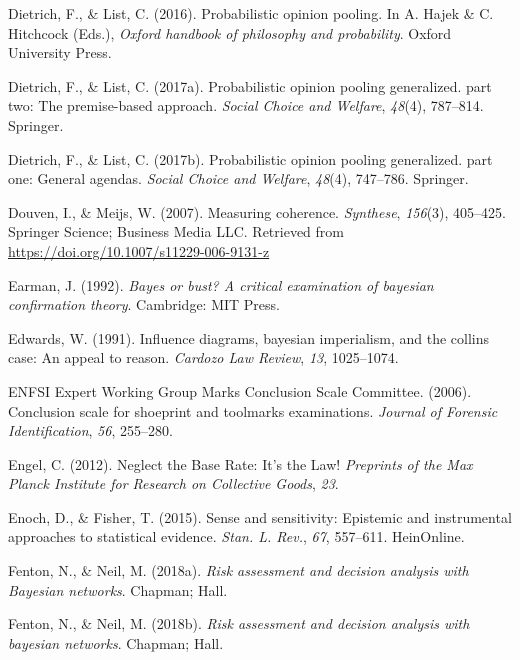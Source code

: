 \documentclass[11pt,dvipsnames,enabledeprecatedfontcommands]{scrartcl}
\begin{document}
\hypertarget{ref-Dietrich2016Probabilistic}{}
Dietrich, F., \& List, C. (2016). Probabilistic opinion pooling. In A.
Hajek \& C. Hitchcock (Eds.), \emph{Oxford handbook of philosophy and
probability}. Oxford University Press.

\hypertarget{ref-dietrich2017probabilistic2}{}
Dietrich, F., \& List, C. (2017a). Probabilistic opinion pooling
generalized. part two: The premise-based approach. \emph{Social Choice
and Welfare}, \emph{48}(4), 787--814. Springer.

\hypertarget{ref-dietrich2017probabilistic1}{}
Dietrich, F., \& List, C. (2017b). Probabilistic opinion pooling
generalized. part one: General agendas. \emph{Social Choice and
Welfare}, \emph{48}(4), 747--786. Springer.

\hypertarget{ref-Douven2007measuring}{}
Douven, I., \& Meijs, W. (2007). Measuring coherence. \emph{Synthese},
\emph{156}(3), 405--425. Springer Science; Business Media LLC. Retrieved
from \url{https://doi.org/10.1007/s11229-006-9131-z}

\hypertarget{ref-earman1992bayes}{}
Earman, J. (1992). \emph{Bayes or bust? A critical examination of
bayesian confirmation theory}. Cambridge: MIT Press.

\hypertarget{ref-Edwards1991Influence-diagr}{}
Edwards, W. (1991). Influence diagrams, bayesian imperialism, and the
collins case: An appeal to reason. \emph{Cardozo Law Review}, \emph{13},
1025--1074.

\hypertarget{ref-ENFSI2006entropy}{}
ENFSI Expert Working Group Marks Conclusion Scale Committee. (2006).
Conclusion scale for shoeprint and toolmarks examinations. \emph{Journal
of Forensic Identification}, \emph{56}, 255--280.

\hypertarget{ref-engel2012NeglectBaseRate}{}
Engel, C. (2012). Neglect the Base Rate: It's the Law! \emph{Preprints
of the Max Planck Institute for Research on Collective Goods},
\emph{23}.

\hypertarget{ref-enoch2015sense}{}
Enoch, D., \& Fisher, T. (2015). Sense and sensitivity: Epistemic and
instrumental approaches to statistical evidence. \emph{Stan. L. Rev.},
\emph{67}, 557--611. HeinOnline.

\hypertarget{ref-Fenton2018risk}{}
Fenton, N., \& Neil, M. (2018a). \emph{Risk assessment and decision
analysis with Bayesian networks}. Chapman; Hall.

\hypertarget{ref-Fenton2018Risk}{}
Fenton, N., \& Neil, M. (2018b). \emph{Risk assessment and decision
analysis with bayesian networks}. Chapman; Hall.
\end{document}
